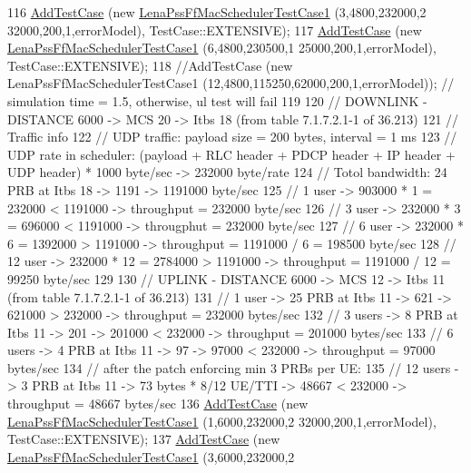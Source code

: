 \begin{DoxyCode}
116   \hyperlink{classns3_1_1TestCase_a3718088e3eefd5d6454569d2e0ddd835}{AddTestCase} (\textcolor{keyword}{new} \hyperlink{classLenaPssFfMacSchedulerTestCase1}{LenaPssFfMacSchedulerTestCase1} (3,4800,232000,2
      32000,200,1,errorModel), TestCase::EXTENSIVE);
117   \hyperlink{classns3_1_1TestCase_a3718088e3eefd5d6454569d2e0ddd835}{AddTestCase} (\textcolor{keyword}{new} \hyperlink{classLenaPssFfMacSchedulerTestCase1}{LenaPssFfMacSchedulerTestCase1} (6,4800,230500,1
      25000,200,1,errorModel), TestCase::EXTENSIVE);
118   \textcolor{comment}{//AddTestCase (new LenaPssFfMacSchedulerTestCase1 (12,4800,115250,62000,200,1,errorModel)); // simulation
       time = 1.5, otherwise, ul test will fail}
119 
120   \textcolor{comment}{// DOWNLINK - DISTANCE 6000 -> MCS 20 -> Itbs 18 (from table 7.1.7.2.1-1 of 36.213)}
121   \textcolor{comment}{// Traffic info}
122   \textcolor{comment}{//   UDP traffic: payload size = 200 bytes, interval = 1 ms}
123   \textcolor{comment}{//   UDP rate in scheduler: (payload + RLC header + PDCP header + IP header + UDP header) * 1000 byte/sec
       -> 232000 byte/rate }
124   \textcolor{comment}{// Totol bandwidth: 24 PRB at Itbs 18 -> 1191 -> 1191000 byte/sec}
125   \textcolor{comment}{// 1 user -> 903000 * 1 = 232000 < 1191000 -> throughput = 232000 byte/sec}
126   \textcolor{comment}{// 3 user -> 232000 * 3 = 696000 < 1191000 -> througphut = 232000 byte/sec}
127   \textcolor{comment}{// 6 user -> 232000 * 6 = 1392000 > 1191000 -> throughput = 1191000 / 6 = 198500 byte/sec}
128   \textcolor{comment}{// 12 user -> 232000 * 12 = 2784000 > 1191000 -> throughput =  1191000 / 12 = 99250 byte/sec}
129 
130   \textcolor{comment}{// UPLINK - DISTANCE 6000 -> MCS 12 -> Itbs 11 (from table 7.1.7.2.1-1 of 36.213)}
131   \textcolor{comment}{// 1 user -> 25 PRB at Itbs 11 -> 621 -> 621000 > 232000 -> throughput = 232000 bytes/sec}
132   \textcolor{comment}{// 3 users -> 8 PRB at Itbs 11 -> 201 -> 201000 < 232000 -> throughput = 201000  bytes/sec}
133   \textcolor{comment}{// 6 users -> 4 PRB at Itbs 11 -> 97 -> 97000 < 232000 -> throughput = 97000 bytes/sec}
134   \textcolor{comment}{// after the patch enforcing min 3 PRBs per UE:}
135   \textcolor{comment}{// 12 users -> 3 PRB at Itbs 11 -> 73 bytes * 8/12 UE/TTI -> 48667 < 232000 -> throughput = 48667
       bytes/sec}
136   \hyperlink{classns3_1_1TestCase_a3718088e3eefd5d6454569d2e0ddd835}{AddTestCase} (\textcolor{keyword}{new} \hyperlink{classLenaPssFfMacSchedulerTestCase1}{LenaPssFfMacSchedulerTestCase1} (1,6000,232000,2
      32000,200,1,errorModel), TestCase::EXTENSIVE);
137   \hyperlink{classns3_1_1TestCase_a3718088e3eefd5d6454569d2e0ddd835}{AddTestCase} (\textcolor{keyword}{new} \hyperlink{classLenaPssFfMacSchedulerTestCase1}{LenaPssFfMacSchedulerTestCase1} (3,6000,232000,2

\end{DoxyCode}

